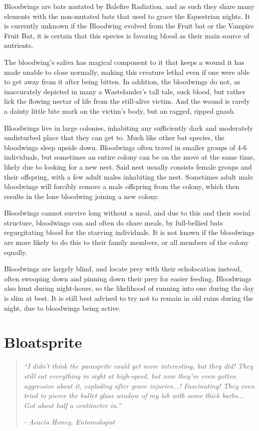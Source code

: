 \documentclass[11pt,a4paper,twocolumn]{book}
\begin{document}
	Bloodwings are bats mutated by Balefire Radiation, and as such they share many elements with the non-mutated bats that used to grace the Equestrian nights. It is currently unknown if the Bloodwing evolved from the Fruit bat or the Vampire Fruit Bat, it is certain that this species is favoring blood as their main source of nutrients. 
	
	The bloodwing's saliva has magical component to it that keeps a wound it has made unable to close normally, making this creature lethal even if one were able to get away from it after being bitten. 
	In addition, the bloodwings do not, as inaccurately depicted in many a Wastelander's tall tale, suck blood, but rather lick the flowing nectar of life from the still-alive victim. And the wound is rarely a dainty little bite mark on the victim's body, but an ragged, ripped gnash.
	
	\bigskip
	Bloodwings live in large colonies, inhabiting any sufficiently dark and moderately undisturbed place that they can get to. Much like other bat species, the bloodwings sleep upside down. Bloodwings often travel in smaller groups of 4-6 individuals, but sometimes an entire colony can be on the move at the same time, likely due to looking for a new nest. 
	Said nest usually consists female groups and their offspring, with a few adult males inhabiting the nest. Sometimes adult male bloodwings will forcibly remove a male offspring from the colony, which then results in the lone bloodwing joining a new colony. 
	
	Bloodwings cannot survive long without a meal, and due to this and their social structure, bloodwings can and often do share meals, by full-bellied bats regurgitating blood for the starving individuals. It is not known if the bloodwings are more likely to do this to their family members, or all members of the colony equally.
	
	Bloodwings are largely blind, and locate prey with their echolocation instead, often swooping down and pinning down their prey for easier feeding. Bloodwings also hunt during night-hours, so the likelihood of running into one during the day is slim at best. It is still best advised to try not to remain in old ruins during the night, due to bloodwings being active.
	
	\clearpage
	
	\section*{Bloatsprite}
	\begin{quote}
		\emph{``I didn't think the parasprite could get more interesting, but they did! They still eat everything in sight at high-speed, but now they've even gotten aggressive about it, exploding after grave injuries...! Fascinating! They even tried to pierce the bullet glass window of my lab with some thick barbs... Got about half a centimeter in.''}
		
		\emph{-	Acacia Honey, Entomologist}
	\end{quote}
	
\end{document}
